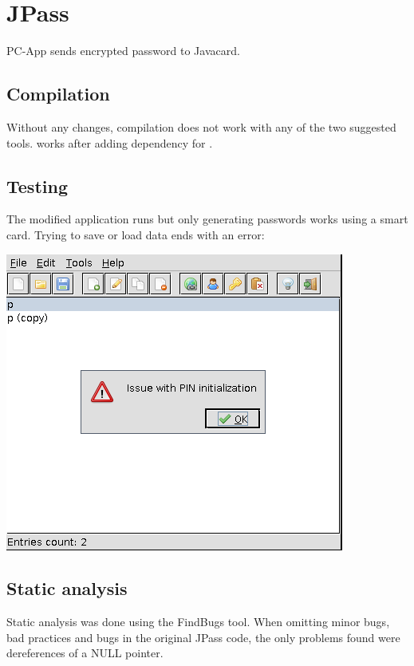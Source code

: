 \documentclass[paper=a4, fontsize=12pt]{scrartcl}
\begin{document}
\section{JPass}
PC-App sends encrypted password to Javacard. %

\subsection{Compilation}
Without any changes, compilation does not work with any of the two suggested tools.
\verb@Maven@ works after adding dependency for \verb@jcardsim@.

\subsection{Testing}
The modified application runs but only generating passwords works using a smart card.
Trying to save or load data ends with an error:

\includegraphics[scale=0.5]{jpass_error}

\subsection{Static analysis}
Static analysis was done using the FindBugs tool.
When omitting minor bugs, bad practices and bugs in the original JPass code, the only problems found were dereferences of a NULL pointer.
\end{document}
